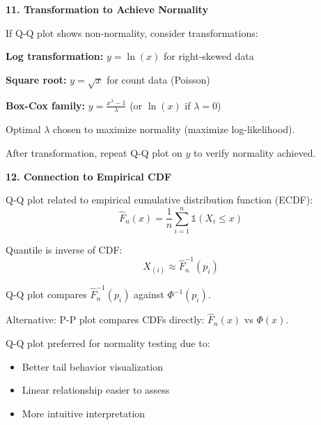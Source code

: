 \documentclass[12pt]{article}
\begin{document}
\begin{explanation}
\textbf{11. Transformation to Achieve Normality}

If Q-Q plot shows non-normality, consider transformations:

\textbf{Log transformation:} $y = \ln(x)$ for right-skewed data

\textbf{Square root:} $y = \sqrt{x}$ for count data (Poisson)

\textbf{Box-Cox family:} $y = \frac{x^\lambda - 1}{\lambda}$ (or $\ln(x)$ if $\lambda = 0$)

Optimal $\lambda$ chosen to maximize normality (maximize log-likelihood).

After transformation, repeat Q-Q plot on $y$ to verify normality achieved.

\textbf{12. Connection to Empirical CDF}

Q-Q plot related to empirical cumulative distribution function (ECDF):
\[\hat{F}_n(x) = \frac{1}{n}\sum_{i=1}^{n} \mathbb{1}(X_i \leq x)\]

Quantile is inverse of CDF:
\[X_{(i)} \approx \hat{F}_n^{-1}(p_i)\]

Q-Q plot compares $\hat{F}_n^{-1}(p_i)$ against $\Phi^{-1}(p_i)$.

Alternative: P-P plot compares CDFs directly: $\hat{F}_n(x)$ vs $\Phi(x)$.

Q-Q plot preferred for normality testing due to:
\begin{itemize}
\item Better tail behavior visualization
\item Linear relationship easier to assess
\item More intuitive interpretation
\end{itemize}

\end{explanation}
\end{document}
